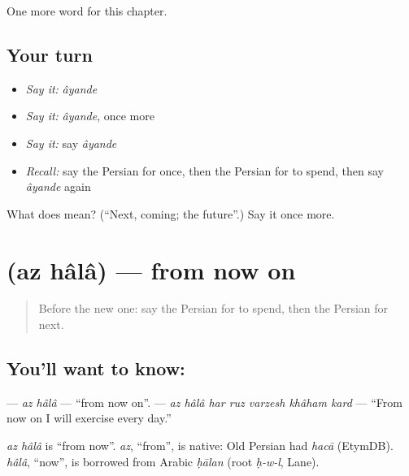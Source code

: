 \begin{grammarlens}[title={What you've built}]
One more word for this chapter.
\end{grammarlens}

\subsection*{Your turn}
\begin{itemize}
\raggedright
  \item \emph{Say it:} \emph{âyande}
  \item \emph{Say it:} \emph{âyande}, once more
  \item \emph{Say it:} say \emph{âyande}
  \item \emph{Recall:} say the Persian for once, then the Persian for to spend, then say \emph{âyande} again
\end{itemize}

\begin{tcolorbox}[breakable,colback=teal!4,colframe=teal!35!black,title={Before you move on}]
What does  mean? (\textquotedblleft{}Next, coming; the future\textquotedblright{}.) Say it once more.
\end{tcolorbox}
\section[\texorpdfstring{\fa{از} \fa{حالا} (az hâlâ)}{از حالا (az hâlâ)}]{  (az hâlâ) — from now on}

\label{lesson:FA-C138-az-hala}



\begin{quote}
Before the new one: say the Persian for to spend, then the Persian for next.
\end{quote}

\subsection*{You'll want to know:  }
\textbf{ } — \emph{az hâlâ} — \textquotedblleft{}from now on\textquotedblright{}. \textbf{      } — \emph{az hâlâ har ruz varzesh khâham kard} — \textquotedblleft{}From now on I will exercise every day.\textquotedblright{}

\begin{cousinweb}
\emph{az hâlâ} is \textquotedblleft{}from now\textquotedblright{}. \emph{az}, \textquotedblleft{}from\textquotedblright{}, is native: Old Persian had \emph{hacā} (EtymDB). \emph{hâlâ}, \textquotedblleft{}now\textquotedblright{}, is borrowed from Arabic \emph{ḥālan} (root \emph{ḥ-w-l}, Lane).
\end{cousinweb}

